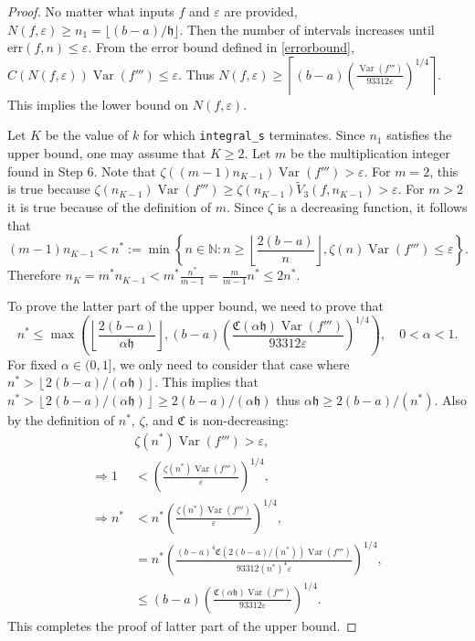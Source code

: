\documentclass{iitthesis}
\DeclareMathOperator{\Var}{Var}
\theoremstyle{definition}
\theoremstyle{remark}
\begin{document}
\begin{proof}
  No matter what inputs $f$ and $\varepsilon$ are provided, $N(f,\varepsilon)\ge n_1=\lfloor (b-a)/\mathfrak{h}\rfloor$. Then the number of intervals increases until $\overline{\text{err}}(f,n)\le\varepsilon$. From the error bound defined in \eqref{errorbound}, $C(N(f,\varepsilon))\Var(f''')\leq \varepsilon$. Thus $N(f,\varepsilon)\geq \left\lceil(b-a)\left(\frac{\Var(f''')}{93312\varepsilon}\right)^{1/4}\right\rceil$. This implies the lower bound on $N(f,\varepsilon)$.

  Let $K$ be the value of $k$ for which {\tt integral\_s} terminates. Since $n_1$ satisfies the upper bound, one may assume that $K \ge 2$. Let $m$ be the multiplication integer found in Step 6. Note that $\zeta((m-1)n_{K-1})\Var(f''')>\varepsilon$. For $m=2$, this is true because $\zeta(n_{K-1})\Var(f''')\ge\zeta(n_{K-1})\widetilde{V}_{3}(f,n_{K-1})>\varepsilon$. For $m>2$ it is true because of the definition of $m$. Since $\zeta$ is a decreasing function, it follows that
  $$(m-1)n_{K-1}<n^*:=\min\left\{n\in\mathbb{N}:n\ge\left\lfloor\frac{2(b-a)}{n}\right\rfloor,\zeta(n)\Var(f''')\le\varepsilon\right\}.$$
  Therefore $n_K=m^*n_{K-1}<m^*\frac{n^*}{m-1}=\frac{m}{m-1}n^*\le2n^*$.

  To prove the latter part of the upper bound, we need to prove that
  $$n^*\leq\max\left(\left\lfloor\frac{2(b-a)}{\alpha\mathfrak{h}}\right\rfloor,(b-a)\left(\frac{\mathfrak{C}(\alpha\mathfrak{h})\Var(f''')}{93312\varepsilon}\right)^{1/4}\right),\quad 0<\alpha<1.$$
  For fixed $\alpha\in(0,1]$, we only need to consider that case where $n^*>\left\lfloor2(b-a)/(\alpha\mathfrak{h})\right\rfloor$. This implies that $n^*>\left\lfloor2(b-a)/(\alpha\mathfrak{h})\right\rfloor\ge 2(b-a)/(\alpha\mathfrak{h})$ thus $\alpha\mathfrak{h}\ge2(b-a)/(n^*)$. Also by the definition of $n^*$, $\zeta$, and $\mathfrak{C}$ is non-decreasing:
  \begin{align*}
    &\zeta(n^*)\Var(f''')>\varepsilon, \\
    \Rightarrow 1&<\left(\frac{\zeta(n^*)\Var(f''')}{\varepsilon}\right)^{1/4},\\
    \Rightarrow n^*&<n^*\left(\frac{\zeta(n^*)\Var(f''')}{\varepsilon}\right)^{1/4},\\
    &=n^*\left(\frac{(b-a)^4\mathfrak{C}(2(b-a)/(n^*))\Var(f''')}{93312(n^*)^4\varepsilon}\right)^{1/4},\\
    &\le(b-a)\left(\frac{\mathfrak{C}(\alpha\mathfrak{h})\Var(f''')}{93312\varepsilon}\right)^{1/4}.
  \end{align*}
  This completes the proof of latter part of the upper bound.
\end{proof}
\end{document}

